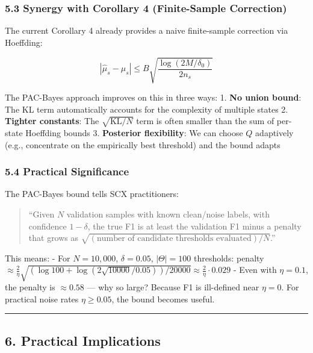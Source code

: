 \documentclass[
  12pt,
]{ctexart}
\begin{document}
\subsubsection{5.3 Synergy with Corollary 4 (Finite-Sample
Correction)}\label{synergy-with-corollary-4-finite-sample-correction}

The current Corollary 4 already provides a naive finite-sample
correction via Hoeffding:

\[|\hat{\mu}_s - \mu_s| \leq B\sqrt{\frac{\log(2M/\delta_0)}{2n_s}}\]

The PAC-Bayes approach improves on this in three ways: 1. \textbf{No
union bound}: The KL term automatically accounts for the complexity of
multiple states 2. \textbf{Tighter constants}: The
\(\sqrt{\text{KL}/N}\) term is often smaller than the sum of per-state
Hoeffding bounds 3. \textbf{Posterior flexibility}: We can choose \(Q\)
adaptively (e.g., concentrate on the empirically best threshold) and the
bound adapts

\subsubsection{5.4 Practical Significance}\label{practical-significance}

The PAC-Bayes bound tells SCX practitioners:

\begin{quote}
``Given \(N\) validation samples with known clean/noise labels, with
confidence \(1-\delta\), the true F1 is at least the validation F1 minus
a penalty that grows as
\(\sqrt{(\text{number of candidate thresholds evaluated}) / N}\).''
\end{quote}

This means: - For \(N = 10{,}000\), \(\delta = 0.05\),
\(|\Theta| = 100\) thresholds: penalty
\(\approx \frac{2}{\eta} \sqrt{(\log 100 + \log(2\sqrt{10000}/0.05)) / 20000} \approx \frac{2}{\eta} \cdot 0.029\)
- Even with \(\eta = 0.1\), the penalty is \(\approx 0.58\) --- why so
large? Because F1 is ill-defined near \(\eta = 0\). For practical noise
rates \(\eta \geq 0.05\), the bound becomes useful.

\begin{center}\rule{0.5\linewidth}{0.5pt}\end{center}

\subsection{6. Practical Implications}\label{practical-implications}
\end{document}

